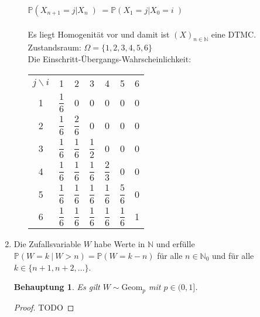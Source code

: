 \documentclass[a4paper]{scrartcl}
\newtheorem*{behaupt}{Behauptung}
\begin{document}
\begin{enumerate}[label=\bfseries 1.\arabic*]
\begin{enumerate}[label=\alph*)]
            $ \mathbb{P} \left( X_{n+1}=j | X_{n} \left) = \mathbb{P} \left( X_{1} = j | X_{0} = i \left)$ \\\\
            Es liegt Homogenität vor und damit ist $ (X)_{n\in\mathbb{N}} $ eine DTMC.\\
            Zustandsraum: $ \Omega = \{1,2,3,4,5,6\} $\\
            Die Einschritt-Übergangs-Wahrscheinlichkeit:\\
            \begin{tabular}[c]{|c||c|c|c|c|c|c|}
            \hline
			$ j\backslash i $&1&2&3&4&5&6\\\hhline{|=||=|=|=|=|=|=|}
			1&$ \dfrac{1}{6} $&0&0&0&0&0\\\hline
			2&$ \dfrac{1}{6} $&$ \dfrac{2}{6} $&0&0&0&0\\\hline
			3&$ \dfrac{1}{6} $&$ \dfrac{1}{6} $&$ \dfrac{1}{2} $&0&0&0\\\hline
			4&$ \dfrac{1}{6} $&$ \dfrac{1}{6} $&$ \dfrac{1}{6} $&$ \dfrac{2}{3} $&0&0\\\hline
			5&$ \dfrac{1}{6} $&$ \dfrac{1}{6} $&$ \dfrac{1}{6} $&$ \dfrac{1}{6} $&$ \dfrac{5}{6} $&0\\\hline
			6&$ \dfrac{1}{6} $&$ \dfrac{1}{6} $&$ \dfrac{1}{6} $&$ \dfrac{1}{6} $&$ \dfrac{1}{6} $&1\\\hline
			\end{tabular}
             
            	

        \end{enumerate}

    \item
        Die Zufallsvariable $W$ habe Werte in $\mathbb{N}$ und erfülle
        $\mathbb{P}(W = k \ |\  W > n) = \mathbb{P}(W = k-n)$ für alle
        $n \in \mathbb{N}_0$ und für alle $k \in \{n+1, n+2, \dotsc\}$.

        \begin{behaupt}
            Es gilt $W \sim \text{Geom}_p$ mit $p \in (0,1]$.
        \end{behaupt}
        \begin{proof}
            TODO
        \end{proof}

\end{enumerate}
\end{document}
